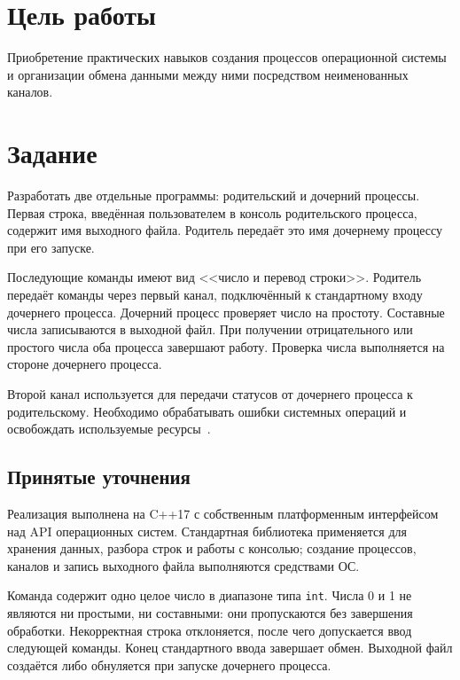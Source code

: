 \section{Цель работы}
Приобретение практических навыков создания процессов операционной системы и организации обмена данными между ними посредством неименованных каналов.

\section{Задание}
Разработать две отдельные программы: родительский и дочерний процессы. Первая строка, введённая пользователем в консоль родительского процесса, содержит имя выходного файла. Родитель передаёт это имя дочернему процессу при его запуске.

Последующие команды имеют вид <<число и перевод строки>>. Родитель передаёт команды через первый канал, подключённый к стандартному входу дочернего процесса. Дочерний процесс проверяет число на простоту. Составные числа записываются в выходной файл. При получении отрицательного или простого числа оба процесса завершают работу. Проверка числа выполняется на стороне дочернего процесса.

Второй канал используется для передачи статусов от дочернего процесса к родительскому. Необходимо обрабатывать ошибки системных операций и освобождать используемые ресурсы~\cite{task}.

\subsection{Принятые уточнения}
Реализация выполнена на C++17 с собственным платформенным интерфейсом над API операционных систем. Стандартная библиотека применяется для хранения данных, разбора строк и работы с консолью; создание процессов, каналов и запись выходного файла выполняются средствами ОС.

Команда содержит одно целое число в диапазоне типа \texttt{int}. Числа 0 и 1 не являются ни простыми, ни составными: они пропускаются без завершения обработки. Некорректная строка отклоняется, после чего допускается ввод следующей команды. Конец стандартного ввода завершает обмен. Выходной файл создаётся либо обнуляется при запуске дочернего процесса.
